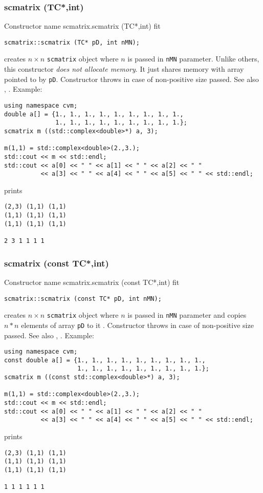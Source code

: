\subsubsection{scmatrix (TC*,int)}
Constructor%
\pdfdest name {scmatrix.scmatrix (TC*,int)} fit
\begin{verbatim}
scmatrix::scmatrix (TC* pD, int nMN);
\end{verbatim}
creates  $n\times n$ \verb"scmatrix" object where $n$ is passed in
\verb"nMN" parameter.
Unlike others, this constructor \textit{does not allocate  memory}.
It just shares  memory with  array pointed to by \verb"pD".
Constructor throws  
in case of non-positive size passed.
See also ,
.
Example:
\begin{Verbatim}
using namespace cvm;
double a[] = {1., 1., 1., 1., 1., 1., 1., 1., 1.,
              1., 1., 1., 1., 1., 1., 1., 1., 1.};
scmatrix m ((std::complex<double>*) a, 3);

m(1,1) = std::complex<double>(2.,3.);
std::cout << m << std::endl;
std::cout << a[0] << " " << a[1] << " " << a[2] << " "
          << a[3] << " " << a[4] << " " << a[5] << " " << std::endl;
\end{Verbatim}
prints
\begin{Verbatim}
(2,3) (1,1) (1,1)
(1,1) (1,1) (1,1)
(1,1) (1,1) (1,1)

2 3 1 1 1 1
\end{Verbatim}
\newpage


\subsubsection{scmatrix (const TC*,int)}
Constructor%
\pdfdest name {scmatrix.scmatrix (const TC*,int)} fit
\begin{verbatim}
scmatrix::scmatrix (const TC* pD, int nMN);
\end{verbatim}
creates  $n\times n$ \verb"scmatrix" object where $n$ is passed in
\verb"nMN" parameter
and copies $n*n$ elements of  array \verb"pD" to it .
Constructor throws  
in case of non-positive size passed.
See also ,
.
Example:
\begin{Verbatim}
using namespace cvm;
const double a[] = {1., 1., 1., 1., 1., 1., 1., 1., 1.,
                    1., 1., 1., 1., 1., 1., 1., 1., 1.};
scmatrix m ((const std::complex<double>*) a, 3);

m(1,1) = std::complex<double>(2.,3.);
std::cout << m << std::endl;
std::cout << a[0] << " " << a[1] << " " << a[2] << " "
          << a[3] << " " << a[4] << " " << a[5] << " " << std::endl;
\end{Verbatim}
prints
\begin{Verbatim}
(2,3) (1,1) (1,1)
(1,1) (1,1) (1,1)
(1,1) (1,1) (1,1)

1 1 1 1 1 1
\end{Verbatim}
\newpage




